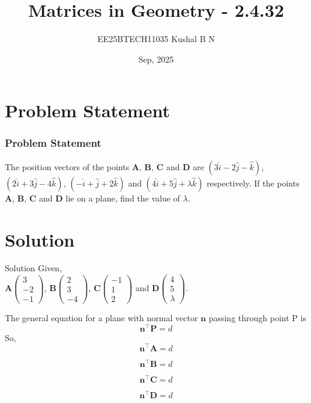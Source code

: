 \documentclass{beamer}
\title{Matrices in Geometry - 2.4.32}
\author{EE25BTECH11035  Kushal B N}
\date{Sep, 2025}
\let\vec\mathbf
\providecommand{\brak}[1]{\ensuremath{\left(#1\right)}}
\theoremstyle{remark}
\newcommand{\myvec}[1]{\ensuremath{\begin{pmatrix}#1\end{pmatrix}}}
\begin{document}
\maketitle

\section{Problem Statement}
\begin{frame}
\frametitle{Problem Statement}
The position vectors of the points $\vec{A}$, $\vec{B}$, $\vec{C}$ and $\vec{D}$ are $\brak{3\hat{i}-2\hat{j}-\hat{k}}$, $\brak{2\hat{i}+3\hat{j}-4\hat{k}}$, $\brak{-\hat{i}+\hat{j}+2\hat{k}}$ and $\brak{4\hat{i}+5\hat{j}+\lambda\hat{k}}$ respectively. If the points $\vec{A}$, $\vec{B}$, $\vec{C}$ and $\vec{D}$ lie on a plane, find the value of $\lambda$.

\end{frame}

\section{Solution}
\begin{frame}{Solution}
Given,\\
$\vec{A}\myvec{3\\-2\\-1}$, $\vec{B}\myvec{2\\3\\-4}$, $\vec{C}\myvec{-1\\1\\2}$ and $\vec{D}\myvec{4\\5\\\lambda}$.

The general equation for a plane with normal vector $\vec{n}$ passing through point P is \\
\begin{equation}
    \vec{n}^{\top}\vec{P} = d
\end{equation}
So,
\begin{equation}
    \vec{n}^{\top}\vec{A} = d
\end{equation}

\begin{equation}
    \vec{n}^{\top}\vec{B} = d
\end{equation}

\begin{equation}
    \vec{n}^{\top}\vec{C} = d
\end{equation}

\begin{equation}
    \vec{n}^{\top}\vec{D} = d
\end{equation}

\end{frame}
\end{document}
